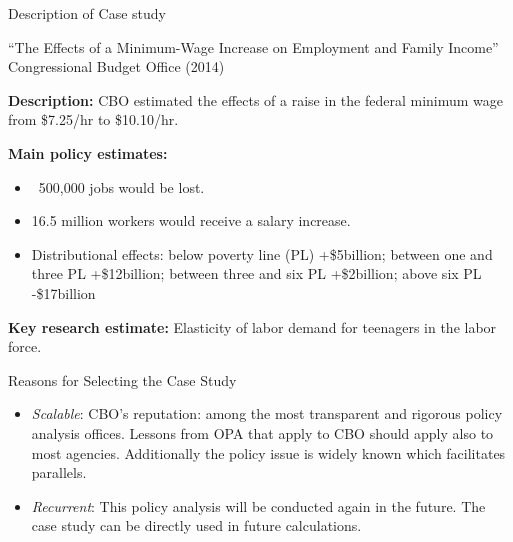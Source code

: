 \documentclass{beamer}
\begin{document}
\begin{frame}[label =  desc_cs]{Description of Case study}
\begin{center}
``The Effects of a Minimum-Wage Increase on Employment and Family Income'' 
Congressional Budget Office (2014)
\end{center}

\textbf{Description:} CBO estimated the effects of a raise in the federal minimum wage from \$7.25/hr to \$10.10/hr. 


\textbf{Main policy estimates:}
\begin{itemize}
\item ~500,000 jobs would be lost.
\item 16.5 million workers would receive a salary increase. 
\item Distributional effects: below poverty line (PL) +\$5billion; between one and three PL +\$12billion; between three and six PL +\$2billion; above six PL -\$17billion
\end{itemize}

\textbf{Key research estimate:} Elasticity of labor demand for teenagers in the labor force. 
\end{frame}



\begin{frame}[label = reas_cs]{Reasons for Selecting the Case Study}
\vspace*{1em}
\begin{itemize}
\item \textit{Scalable}: CBO's reputation: among the most transparent and rigorous policy analysis offices. Lessons from OPA that apply to CBO should apply also to most agencies.  Additionally the policy issue is widely known which facilitates parallels. 
\item \textit{Recurrent}: This policy analysis will be conducted again in the future. The case study can be directly used in future calculations. 
\end{itemize}

\end{frame}
\end{document}
